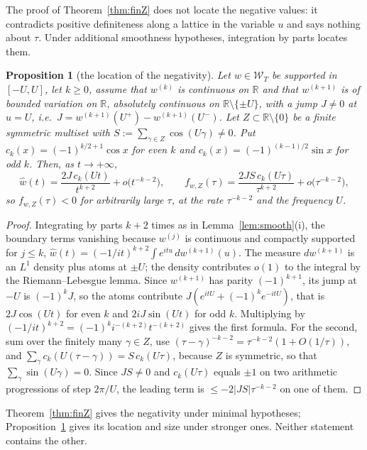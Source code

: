 \documentclass[11pt]{amsart}
\newtheorem{proposition}[theorem]{Proposition}
\theoremstyle{definition}
\theoremstyle{remark}
\newcommand{\R}{\mathbb R}
\newcommand{\wh}{\widehat w}
\newcommand{\Wcl}{\mathcal W_T}
\begin{document}
The proof of Theorem~\ref{thm:finZ} does not locate the negative values: it contradicts positive
definiteness along a lattice in the variable $u$ and says nothing about $\tau$. Under additional
smoothness hypotheses, integration by parts locates them.

\begin{proposition}[the location of the negativity]\label{prop:loc}
Let $w\in\Wcl$ be supported in $[-U,U]$, let $k\ge0$, assume that $w^{(k)}$ is continuous on $\R$ and
that $w^{(k+1)}$ is of bounded variation on $\R$, absolutely continuous on $\R\setminus\{\pm U\}$, with
a jump $J\ne0$ at $u=U$, i.e.\ $J=w^{(k+1)}(U^+)-w^{(k+1)}(U^-)$. Let $Z\subset\R\setminus\{0\}$ be a
finite symmetric multiset with $S:=\sum_{\gamma\in Z}\cos(U\gamma)\ne0$. Put $c_k(x)=(-1)^{k/2+1}\cos x$
for even $k$ and $c_k(x)=(-1)^{(k-1)/2}\sin x$ for odd $k$. Then, as $t\to+\infty$,
\[
\wh(t)=\frac{2J\,c_k(Ut)}{t^{k+2}}+o\big(t^{-k-2}\big),\qquad
f_{w,Z}(\tau)=\frac{2JS\,c_k(U\tau)}{\tau^{k+2}}+o\big(\tau^{-k-2}\big),
\]
so $f_{w,Z}(\tau)<0$ for arbitrarily large $\tau$, at the rate $\tau^{-k-2}$ and the frequency $U$.
\end{proposition}
\begin{proof}
Integrating by parts $k+2$ times as in Lemma~\ref{lem:smooth}(i), the boundary terms vanishing because
$w^{(j)}$ is continuous and compactly supported for $j\le k$,
$\wh(t)=(-1/it)^{k+2}\int e^{itu}\,dw^{(k+1)}(u)$. The measure $dw^{(k+1)}$ is an $L^1$ density plus
atoms at $\pm U$; the density contributes $o(1)$ to the integral by the Riemann--Lebesgue lemma. Since
$w^{(k+1)}$ has parity $(-1)^{k+1}$, its jump at $-U$ is $(-1)^kJ$, so the atoms contribute
$J(e^{itU}+(-1)^ke^{-itU})$, that is $2J\cos(Ut)$ for even $k$ and $2iJ\sin(Ut)$ for odd $k$. Multiplying
by $(-1/it)^{k+2}=(-1)^k i^{-(k+2)}t^{-(k+2)}$ gives the first formula. For the second, sum over the
finitely many $\gamma\in Z$, use $(\tau-\gamma)^{-k-2}=\tau^{-k-2}(1+O(1/\tau))$, and
$\sum_\gamma c_k(U(\tau-\gamma))=S\,c_k(U\tau)$, because $Z$ is symmetric, so that
$\sum_\gamma\sin(U\gamma)=0$. Since $JS\ne0$ and $c_k(U\tau)$ equals $\pm1$ on two arithmetic
progressions of step $2\pi/U$, the leading term is $\le-2|JS|\tau^{-k-2}$ on one of them.
\end{proof}

Theorem~\ref{thm:finZ} gives the negativity under minimal hypotheses; Proposition~\ref{prop:loc} gives
its location and size under stronger ones. Neither statement contains the other.
\end{document}
